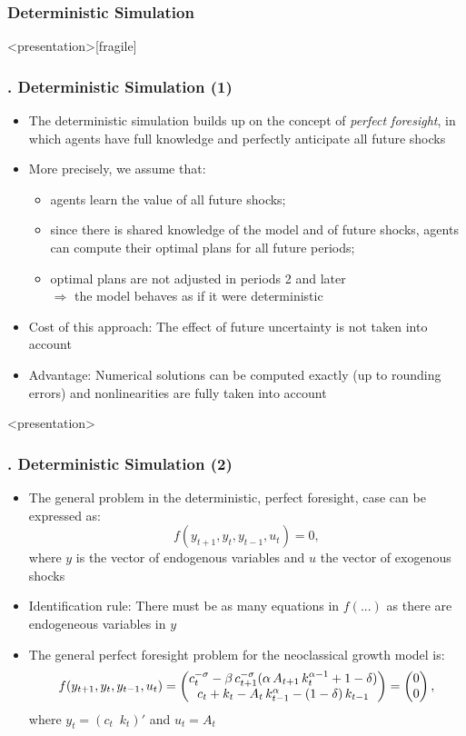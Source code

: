 \documentclass[11pt,aspectratio=169]{beamer}
\begin{document}
\subsubsection{Deterministic Simulation}
\begin{frame}<presentation>[fragile]
	\frametitle{{\thesection.\thesubsection\thinspace\thesubsubsection} Deterministic Simulation (1)}
	\begin{itemize}
		\item The deterministic simulation builds up on the concept of \textit{perfect foresight}, in which agents have full knowledge and perfectly anticipate all future shocks
		\item More precisely, we assume that:
		\begin{itemize}
			\item agents learn the value of all future shocks;
			\item since there is shared knowledge of the model and of future shocks, agents can compute their optimal plans for all future periods;
			\item optimal plans are not adjusted in periods 2 and later\\ $\Rightarrow$ the model behaves as if it were deterministic
		\end{itemize}
		\item Cost of this approach: The effect of future uncertainty is not taken into account
		\item Advantage: Numerical solutions can be computed exactly (up to rounding errors) and nonlinearities are fully taken into account
	\end{itemize}
\end{frame}
\begin{frame}<presentation>
	\frametitle{{\thesection.\thesubsection\thinspace\thesubsubsection} Deterministic Simulation (2)}
	\begin{itemize}
		\item The general problem in the deterministic, perfect foresight, case can be expressed as: $$f(y_{t+1},y_t,y_{t-1},u_t)=0,$$ where $y$ is the vector of endogenous variables and $u$ the vector of exogenous shocks
		\item Identification rule: There must be as many equations in $f(...)$ as there are endogeneous variables in $y$
		\item The general perfect foresight problem for the neoclassical growth model is:
		\begin{gather*}
		f(y_{t+1},y_t,y_{t-1},u_t) = \begin{pmatrix} 	c_t^{-\sigma} - \beta  \thinspace c_{t+1}^{-\sigma} (\alpha \thinspace A_{t+1}  \thinspace k_t^{\alpha -1} + 1 - \delta)\\ c_t + k_t - A_t  \thinspace k_{t-1}^\alpha - (1-\delta)  \thinspace k_{t-1} \end{pmatrix} = \begin{pmatrix}
		0 \\0
		\end{pmatrix},
		\end{gather*}
		where $y_t = (c_t \enspace k_t)'$ and $u_t = A_t$
	\end{itemize}
\end{frame}
\end{document}
